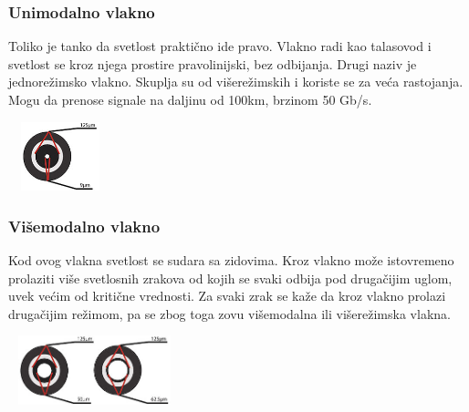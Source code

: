 \documentclass{article} %
\begin{document}
\subsubsection{Unimodalno vlakno}
Toliko je tanko da svetlost praktično ide pravo. Vlakno radi kao talasovod i svetlost se kroz njega prostire pravolinijski, bez odbijanja. Drugi naziv je jednorežimsko vlakno. Skuplja su od višerežimskih i koriste se za veća rastojanja. Mogu da prenose signale na daljinu od 100km, brzinom 50 Gb/s.
\begin{center}
\includegraphics[width=3cm, height=2cm]{unimodalno}\\
\end{center}

\subsubsection{Višemodalno vlakno}
Kod ovog vlakna svetlost se sudara sa zidovima. Kroz vlakno može istovremeno prolaziti više svetlosnih zrakova od kojih se svaki odbija pod drugačijim uglom, uvek većim od kritične vrednosti. Za svaki zrak se kaže da kroz vlakno prolazi drugačijim režimom, pa se zbog toga zovu višemodalna ili višerežimska vlakna.
\begin{center}
\includegraphics[width=5cm, height=2cm]{visemodalno}\\
\end{center}
\end{document}
